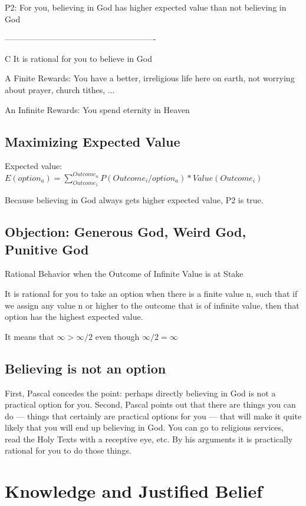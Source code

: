 \documentclass{article}
\begin{document}
P2: For you, believing in God has higher expected value than not believing in God

-------------------------------------------------------

C It is rational for you to believe in God


A Finite Rewards: You have a better, irreligious life here on earth, not worrying about prayer, church tithes, ...

An Infinite Rewards: You spend eternity in Heaven

\subsection{Maximizing Expected Value}

Expected value: $E(option_a) = \sum_{Outcome_1}^{Outcome_n} P (Outcome_i/ option_a)* Value(Outcome_i)$


Because believing in God always gets higher expected value, P2 is true.


\subsection{Objection: Generous God, Weird God, Punitive God }

Rational Behavior when the Outcome of Infinite Value is at Stake

It is rational for you to take an option when there is a finite value n, such that if we assign any value n or higher to the outcome that is of infinite value, then that option has the highest expected value.

It means that $\infty > \infty/2$ even though $\infty/2 = \infty$

\subsection{Believing is not an option}

First, Pascal concedes the point: perhaps directly believing in God is not a practical option for you. Second, Pascal points out that there are things you can do --- things that certainly are practical options for you --- that will make it quite likely that you will end up believing in God. You can go to religious services, read the Holy Texts with a receptive eye, etc. By his arguments it is practically rational for you to do those things.

\section{Knowledge and Justified Belief}
\end{document}
